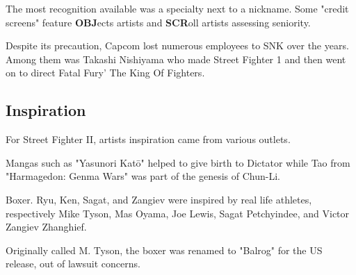 \begin{trivia}
The most recognition available was a specialty next to a nickname. Some "credit screens" feature \textbf{OBJ}ects artists and \textbf{SCR}oll artists assessing seniority.
\end{trivia}







Despite its precaution, Capcom lost numerous employees to SNK over the years. Among them was Takashi Nishiyama who made Street Fighter 1 and then went on to direct Fatal Fury' The King Of Fighters\cite{YoshikiOkamotoTakashiNishiyama}.
 














\subsection{Inspiration}
For Street Fighter II, artists inspiration came from various outlets. 

Mangas such as "Yasunori Katō" helped to give birth to Dictator while Tao from "Harmagedon: Genma Wars" was part of the genesis of Chun-Li. 

Boxer. Ryu, Ken, Sagat, and Zangiev were inspired by real life athletes, respectively Mike Tyson, Mas Oyama, Joe Lewis, Sagat Petchyindee, and Victor Zangiev Zhanghief.

\begin{trivia}
Originally called M. Tyson, the boxer was renamed to "Balrog" for the US release, out of lawsuit concerns. 
\end{trivia}

